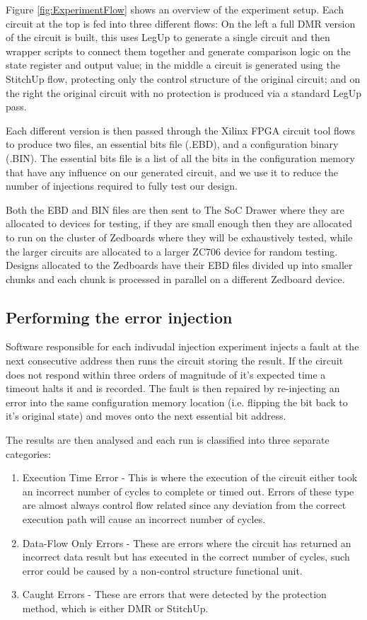 Figure \ref{fig:ExperimentFlow} shows an overview of the experiment setup.
Each circuit at the top is fed into three different flows:
On the  left a full DMR version of the circuit is built, this uses LegUp to generate a 
single circuit and then wrapper scripts to connect them together and
generate comparison logic on the state register and output value;
in the middle a circuit is generated using the StitchUp flow, protecting only the control
structure of the original circuit; and on the right the original circuit with no protection
is produced via a standard LegUp pass.

Each different version is then passed through the Xilinx FPGA circuit tool flows to produce
two files, an essential bits file (.EBD), and a configuration binary (.BIN).
The essential bits file is a list of all the bits in the configuration memory that have any
influence on our generated circuit, and we use it to reduce the number of injections
required to fully test our design.

Both the EBD and BIN files are then sent to The SoC Drawer where they are allocated to
devices for testing, if they are small enough then they are allocated to run on the 
cluster of Zedboards where they will be exhaustively tested, while the larger circuits 
are allocated to a larger ZC706 device for random testing.
Designs allocated to the Zedboards have their EBD files divided up
into smaller chunks and each chunk is processed in parallel on a different Zedboard device.

\subsection{Performing the error injection}
Software responsible for each indivudal injection experiment injects a fault at the 
next consecutive address then runs the circuit storing the result.
If the circuit does not respond within three orders of magnitude of it's expected time
a timeout halts it and is recorded.
The fault is then repaired by re-injecting an error into the
same configuration memory location (i.e. flipping the bit back to it's original state)
and moves onto the next essential bit address.

The results are then analysed and each run is classified into three separate categories:

\begin{enumerate}
\item Execution Time Error - This is where the execution of the circuit either took
an incorrect number of cycles to complete or timed out. Errors of these type are almost
always control flow related since any deviation from the correct execution path will cause
an incorrect number of cycles.
\item Data-Flow Only Errors - These are errors where the circuit has returned an incorrect
data result but has executed in the correct number of cycles, such error could be caused
by a non-control structure functional unit.
\item Caught Errors - These are errors that were detected by the protection method, which is
either DMR or StitchUp.
\end{enumerate}


